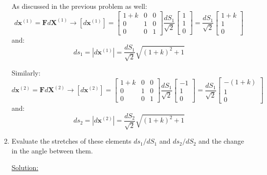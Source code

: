 \documentclass{article}
\newcommand{\ee}{\end{equation}}
\newcommand{\be}{\begin{equation}}
\newcommand{\bs}{\boldsymbol}
\newif\ifsolution
\begin{document}
\begin{enumerate}
As discussed in the previous problem as well:
\be
d\bs{x}^{(1)}=\bs{F}d\bs{X}^{(1)} \to [d\bs{x}^{(1)}] = \left[\begin{array}{lll}  1+k & 0 & 0 \\ 0 & 1 & 0 \\ 0 & 0 & 1                
               \end{array}
\right] \frac{dS_1}{\sqrt{2}} \left[\begin{array}{l} 1 \\1 \\0 \end{array} \right] =\frac{dS_1}{\sqrt{2}} 
\left[\begin{array}{l} 1+k \\1 \\0 \end{array} \right]
\ee
and:
\be
ds_1=|d\bs{x}^{(1)}|=\frac{dS_1}{\sqrt{2}} \sqrt{(1+k)^2+1}
\ee

Similarly:
\be
d\bs{x}^{(2)}=\bs{F}d\bs{X}^{(2)} \to [d\bs{x}^{(2)}] = \left[\begin{array}{lll}  1+k & 0 & 0 \\ 0 & 1 & 0 \\ 0 & 0 & 1                
               \end{array}
\right] \frac{dS_1}{\sqrt{2}} \left[\begin{array}{l} -1 \\1 \\0 \end{array} \right] =\frac{dS_1}{\sqrt{2}} 
\left[\begin{array}{l} -(1+k) \\1 \\0 \end{array} \right]
\ee
and:
\be
ds_2=|d\bs{x}^{(2)}|=\frac{dS_2}{\sqrt{2}} \sqrt{(1+k)^2+1}
\ee
\fi
\item  Evaluate the stretches of these elements $ds_1/dS_1$ and $ds_2/dS_2$ and the change in the angle between them.

\ifsolution
\underline{Solution:}


\end{enumerate}
\end{document}
